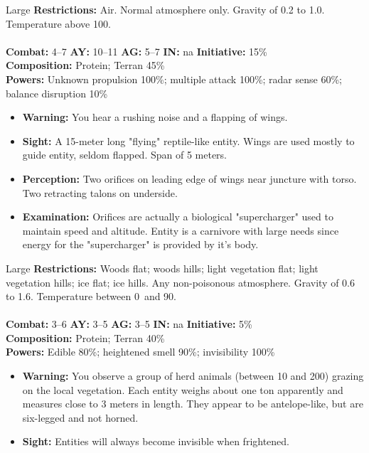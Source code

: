\begin{creature}{Large}
\textbf{Restrictions:} Air. Normal atmosphere only. Gravity of 0.2 to 1.0. Temperature above 100\textdegree. \\\\
\textbf{Combat:} 4--7 \textbf{AY:} 10--11 \textbf{AG:} 5--7 \textbf{IN:} na \textbf{Initiative:} 15\% \\
\textbf{Composition:} Protein; Terran 45\% \\
\textbf{Powers:} Unknown propulsion 100\%; multiple attack 100\%; radar sense 60\%; balance disruption 10\% 
\begin{itemize}
\item \textbf{Warning:} You hear a rushing noise and a flapping of wings. 
\item \textbf{Sight:} A 15-meter long "flying" reptile-like entity. Wings are used mostly to guide entity, seldom flapped. Span of 5 meters. 
\item \textbf{Perception:} Two orifices on leading edge of wings near juncture with torso. Two retracting talons on underside. 
\item \textbf{Examination:} Orifices are actually a biological "supercharger" used to maintain speed and altitude. Entity is a carnivore with large 
needs since energy for the "supercharger" is provided by it's body. 
\end{itemize}
\end{creature}

\hrulefill

\begin{creature}{Large}
\textbf{Restrictions:} Woods flat; woods hills; light vegetation flat; light vegetation hills; ice flat; ice hills. Any non-poisonous atmosphere. 
Gravity of 0.6 to 1.6. Temperature between 0\textdegree\ and 90\textdegree. \\\\
\textbf{Combat:} 3--6 \textbf{AY:} 3--5 \textbf{AG:} 3--5 \textbf{IN:} na \textbf{Initiative:} 5\% \\
\textbf{Composition:} Protein; Terran 40\% \\
\textbf{Powers:} Edible 80\%; heightened smell 90\%; invisibility 100\% 
\begin{itemize}
\item \textbf{Warning:} You observe a group of herd animals (between 10 and 200) grazing on the local vegetation. Each entity weighs about one 
ton apparently and measures close to 3 meters in length. They appear to be antelope-like, but are six-legged and not horned. 
\item \textbf{Sight:} Entities will always become invisible when frightened. 
\end{itemize}
\end{creature}

